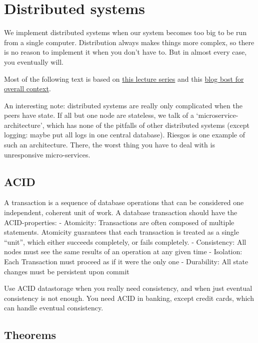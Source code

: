 \hypertarget{distributed-systems}{%
\section{Distributed systems}\label{distributed-systems}}

We implement distributed systems when our system becomes too big to be
run from a single computer. Distribution always makes things more
complex, so there is no reason to implement it when you don't have to.
But in almost every case, you eventually will.

Most of the following text is based on
\href{https://disco.ethz.ch/courses/podc_allstars/lecture/chapter17.pdf}{this
lecture series} and this
\href{https://towardsdatascience.com/distributed-transactions-and-why-you-should-care-116b6da8d72}{blog
bost for overall context}.

An interesting note: distributed systems are really only complicated
when the peers have state. If all but one node are stateless, we talk of
a `microservice-architecture', which has none of the pitfalls of other
distributed systems (except logging: maybe put all logs in one central
database). Riesgos is one example of such an architecture. There, the
worst thing you have to deal with is unresponsive micro-services.

\hypertarget{acid}{%
\subsection{ACID}\label{acid}}

A transaction is a sequence of database operations that can be
considered one independent, coherent unit of work. A database
transaction should have the ACID-properties: - Atomicity: Transactions
are often composed of multiple statements. Atomicity guarantees that
each transaction is treated as a single ``unit'', which either succeeds
completely, or fails completely. - Consistency: All nodes must see the
same results of an operation at any given time - Isolation: Each
Transaction must proceed as if it were the only one - Durability: All
state changes must be persistent upon commit

Use ACID datastorage when you really need consistency, and when just
eventual consistency is not enough. You need ACID in banking, except
credit cards, which can handle eventual consistency.

\hypertarget{theorems}{%
\subsection{Theorems}\label{theorems}}

